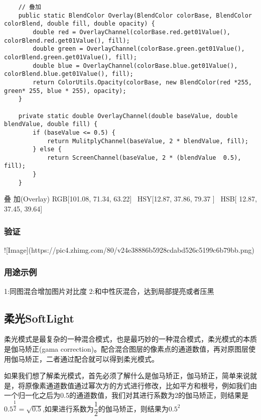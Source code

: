 \begin{lstlisting}
	// 叠加
	public static BlendColor Overlay(BlendColor colorBase, BlendColor colorBlend, double fill, double opacity) {
		double red = OverlayChannel(colorBase.red.get01Value(), colorBlend.red.get01Value(), fill);
		double green = OverlayChannel(colorBase.green.get01Value(), colorBlend.green.get01Value(), fill);
		double blue = OverlayChannel(colorBase.blue.get01Value(), colorBlend.blue.get01Value(), fill);
		return ColorUtils.Opacity(colorBase, new BlendColor(red *255, green* 255, blue * 255), opacity);
	}
	
	private static double OverlayChannel(double baseValue, double blendValue, double fill) {
		if (baseValue <= 0.5) {
			return MulitplyChannel(baseValue, 2 * blendValue, fill);
		} else {
			return ScreenChannel(baseValue, 2 * (blendValue  0.5), fill);
		}
	}
\end{lstlisting}



叠    加(Overlay)       RGB[101.08,  71.34,  63.22]~ HSY[12.87,  37.86,  79.37 ]~ HSB[ 12.87,  37.45,  39.64]


\subsubsection{ 验证}

![Image](https://pic4.zhimg.com/80/v24e38886b5928cdabd526c5199c6b79bb.png)

\subsubsection{ 用途示例}

1:同图混合增加图片对比度
2:和中性灰混合，达到局部提亮或者压黑

\subsection{ 柔光SoftLight}

柔光模式是最复杂的一种混合模式，也是最巧妙的一种混合模式，柔光模式的本质是伽马矫正(gama correction)。配合混合图层的像素点的通道数值，再对原图层使用伽马矫正，二者通过配合就可以得到柔光模式。

如果我们想了解柔光模式，首先必须了解什么是伽马矫正，伽马矫正，简单来说就是，将原像素通道数值通过幂次方的方式进行修改，比如平方和根号，例如我们由一个归一化之后为0.5的通道数值，我们对其进行系数为2的伽马矫正，则结果是$0.5^{\dfrac{1}{2}}=\sqrt{0.5}$,如果进行系数为$\dfrac{1}{2}$的伽马矫正，则结果为$0.5^2$


